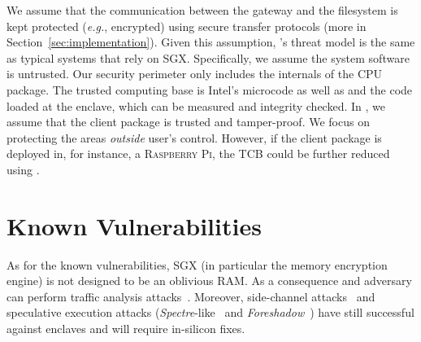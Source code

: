 We assume that the communication between the gateway and the filesystem is kept protected (\emph{e.g.}, encrypted) using secure transfer protocols (more in Section~\ref{sec:implementation}).
Given this assumption, \projName's threat model is the same as typical systems that rely on \textsc{SGX}. 
Specifically, we assume the system software is  untrusted.
Our security perimeter only includes the internals of the CPU package. 
The trusted computing base is Intel's microcode as well as and the code loaded at the enclave, which can be measured and integrity checked. 
In \projName, we assume that the client package is trusted and tamper-proof.
We focus on protecting the areas \emph{outside} user's control. 
However, if the client package is deployed in, for instance, a \textsc{Raspberry Pi}, the TCB could be further reduced using .

\section{Known Vulnerabilities} \label{sec:vulnerabilities}

As for the known vulnerabilities, \textsc{SGX} (in particular the memory encryption engine) is not designed to be an oblivious RAM.
As a consequence and adversary can perform traffic analysis attacks~\cite{Gueron2016}.
Moreover, side-channel attacks~\cite{sgx-sidechannel} and speculative execution attacks (\textit{Spectre}-like~\cite{sgx-spectre} and \textit{Foreshadow}~\cite{foreshadow}) have still successful against enclaves and will require in-silicon fixes.
